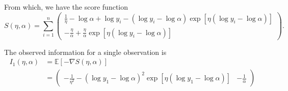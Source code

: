 \documentclass[letterpaper,11pt]{article}
\begin{document}
\begin{enumerate}
\begin{enumerate}
\begin{description}
    From which, we have the score function
    \begin{equation*}
      S\left(\eta,\alpha\right) = \sum_{i=1}^n
      \begin{pmatrix}
        \frac{1}{\eta} - \log\alpha + \log y_i -
        \left(\log y_i - \log\alpha\right)
        \exp\left[\eta\left(\log y_i - \log\alpha\right)\right]
        \\
        -\frac{\eta}{\alpha}
        +\frac{\eta}{\alpha}\exp\left[\eta\left(\log y_i - \log\alpha\right)\right]
      \end{pmatrix}.
    \end{equation*}

    The observed information for a single observation is
    \begin{align*}
      I_1\left(\eta, \alpha\right)
      &= \mathbb{E}\left[-\nabla S\left(\eta,\alpha\right)\right] \\
      &= \begin{pmatrix}
        -\frac{1}{\eta^2} - \left(\log y_1 - \log\alpha\right)^2
        \exp\left[\eta\left(\log y_1 - \log\alpha\right)\right]
        & -\frac{1}{\alpha}
      \end{pmatrix}
    \end{align*}
  \end{description}
\end{enumerate}
\end{enumerate}
\end{document}
